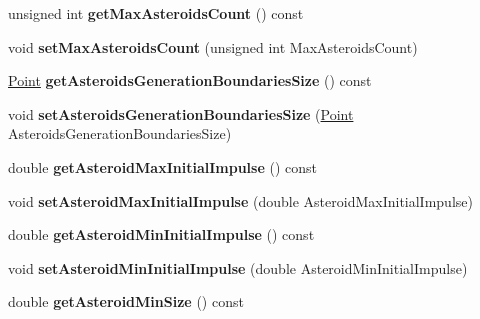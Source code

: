 \begin{DoxyCompactItemize}
\item 
unsigned int {\bfseries get\+Max\+Asteroids\+Count} () const \hypertarget{classGameConfiguration_a9e2d8d296a8d7e59847a716872bd7d6b}{}\label{classGameConfiguration_a9e2d8d296a8d7e59847a716872bd7d6b}

\item 
void {\bfseries set\+Max\+Asteroids\+Count} (unsigned int Max\+Asteroids\+Count)\hypertarget{classGameConfiguration_a2c6e0d4a84aa3b4cb2a2b9e5f1278610}{}\label{classGameConfiguration_a2c6e0d4a84aa3b4cb2a2b9e5f1278610}

\item 
\hyperlink{classPoint}{Point} {\bfseries get\+Asteroids\+Generation\+Boundaries\+Size} () const \hypertarget{classGameConfiguration_ae7c38ee9b8c1fb36cd3a1f7ce5973b62}{}\label{classGameConfiguration_ae7c38ee9b8c1fb36cd3a1f7ce5973b62}

\item 
void {\bfseries set\+Asteroids\+Generation\+Boundaries\+Size} (\hyperlink{classPoint}{Point} Asteroids\+Generation\+Boundaries\+Size)\hypertarget{classGameConfiguration_ae1393d9cf456cb47ddd283886e743648}{}\label{classGameConfiguration_ae1393d9cf456cb47ddd283886e743648}

\item 
double {\bfseries get\+Asteroid\+Max\+Initial\+Impulse} () const \hypertarget{classGameConfiguration_acaff39b0af75f67dbc95a782d67c9169}{}\label{classGameConfiguration_acaff39b0af75f67dbc95a782d67c9169}

\item 
void {\bfseries set\+Asteroid\+Max\+Initial\+Impulse} (double Asteroid\+Max\+Initial\+Impulse)\hypertarget{classGameConfiguration_af4e2f882c3b4bc0fcc28ea560fb17636}{}\label{classGameConfiguration_af4e2f882c3b4bc0fcc28ea560fb17636}

\item 
double {\bfseries get\+Asteroid\+Min\+Initial\+Impulse} () const \hypertarget{classGameConfiguration_ae464b394e5cf22cc9588a3a9071e6563}{}\label{classGameConfiguration_ae464b394e5cf22cc9588a3a9071e6563}

\item 
void {\bfseries set\+Asteroid\+Min\+Initial\+Impulse} (double Asteroid\+Min\+Initial\+Impulse)\hypertarget{classGameConfiguration_aa9030efe9e84388acb960313a2c6baca}{}\label{classGameConfiguration_aa9030efe9e84388acb960313a2c6baca}

\item 
double {\bfseries get\+Asteroid\+Min\+Size} () const \hypertarget{classGameConfiguration_a656ed95533f80d9dd529790487281ca4}{}\label{classGameConfiguration_a656ed95533f80d9dd529790487281ca4}


\end{DoxyCompactItemize}
